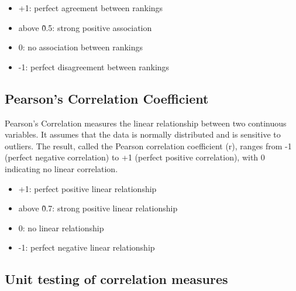\begin{itemize}
    \item +1: perfect agreement between rankings
    \item above \~ 0.5: strong positive association
    \item 0: no association between rankings
    \item -1: perfect disagreement between rankings
\end{itemize}

\subsection{Pearson's Correlation Coefficient}\label{pearsons-correlation-coefficient}

Pearson's Correlation measures the linear relationship between two continuous variables. It assumes that the data is normally distributed and is sensitive to outliers. The result, called the Pearson correlation coefficient (r), ranges from -1 (perfect negative correlation) to +1 (perfect positive correlation), with 0 indicating no linear correlation.

\begin{itemize}
    \item +1: perfect positive linear relationship
    \item above \~ 0.7: strong positive linear relationship
    \item 0: no linear relationship
    \item -1: perfect negative linear relationship
\end{itemize}

\subsection{Unit testing of correlation measures}\label{unit-testing-of-correlation-measures}

